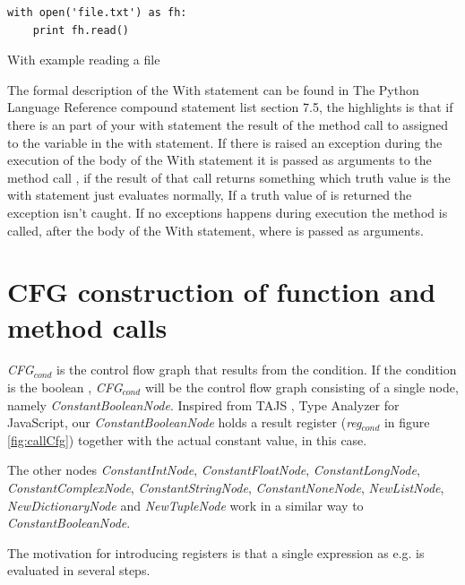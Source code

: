 \begin{listing}[H]
	\begin{verbatim}
with open('file.txt') as fh:
	print fh.read()
	\end{verbatim}
	\caption{With example reading a file}\label{code:withExample}
\end{listing}

The formal description of the With statement can be found in The Python Language Reference compound statement list\cite{pyref.compound} section 7.5, 
the highlights is that if there is an  part of your with statement the result of the method call to  
assigned to the variable in the with statement. If there is raised an exception during the execution of the body of the With statement it is 
passed as arguments to the method call , if the result of that call returns something which truth value is  
the with statement just evaluates normally, If a truth value of  is returned the exception isn't caught. 
If no exceptions happens during execution the  method is called, after the body of the With statement, 
where  is passed as arguments.

\section{CFG construction of function and method calls}
\label{CFG calls}
\textit{CFG$_{\textit{cond}}$} is the control flow graph that results from the condition. If the condition is the boolean , 
\textit{CFG$_{\textit{cond}}$} will be the control flow graph consisting of a single node, namely \textit{ConstantBooleanNode}. 
Inspired from TAJS \cite{tajs}, Type Analyzer for JavaScript, our \textit{ConstantBooleanNode} holds a result register (\textit{reg$_{\textit{cond}}$} in figure \ref{fig:callCfg}) 
together with the actual constant value,  in this case.

The other nodes \textit{ConstantIntNode}, \textit{ConstantFloatNode}, \textit{ConstantLongNode}, \textit{ConstantComplexNode}, \textit{ConstantStringNode}, 
\textit{ConstantNoneNode}, \textit{NewListNode}, \textit{NewDictionaryNode} and \textit{NewTupleNode} work in a similar way to \textit{ConstantBooleanNode}. 

\begin{sloppypar}
  The motivation for introducing registers is that a single expression as e.g.  is evaluated in several steps. 
\end{sloppypar}

